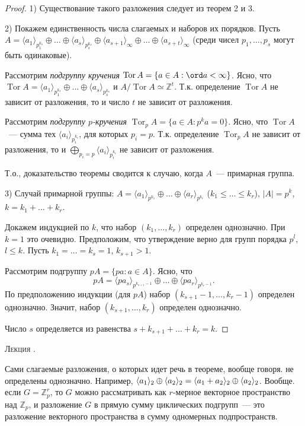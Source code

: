 \documentclass[a4paper]{article}
\newcounter{lec}
\renewcommand{\thelec}{\Roman{lec}}
\newcommand*{\lecture}[1]{\refstepcounter{lec}\vspace{20pt}
\begin{center}{\rmfamily\textsc{Лекция \thelec. \\ \textbf{#1}}}\vspace{5pt}
\end{center}}
\renewcommand{\Tor}{\mathop{\mathrm{Tor}}\nolimits}
\newcommand*{\p}[1]{#1\nobreak\discretionary{}{\hbox{$\mathsurround=0pt #1$}}{}}
\begin{document}
\begin{proof}
1) Существование такого разложения следует из теорем 2 и 3.

2) Покажем единственность числа слагаемых и наборов их порядков.
Пусть $A=\langle a_1\rangle_{p_1^{k_1}}\oplus\ldots\oplus\langle
a_s\rangle_{p_s^{k_s}}\oplus\langle
a_{s+1}\rangle_\infty\oplus\ldots\oplus\langle
a_{s+t}\rangle_\infty$ (среди чисел $p_1,\ldots,p_s$ могут быть
одинаковые).

Рассмотрим \emph{подгруппу кручения} $\Tor A=\{a\in A:\ord
a<\infty\}$. Ясно, что $\Tor A=\langle
a_1\rangle_{p_1^{k_1}}\oplus\ldots\oplus\langle
a_s\rangle_{p_s^{k_s}}$ и $A/\Tor A\simeq\mathbb{Z}^t$. Т.к.
определение $\Tor A$ не зависит от разложения, то и число $t$ не
зависит от разложения.

Рассмотрим \emph{подгруппу $p$-кручения} $\Tor_p A=\{a\in
A:p^ka=0\}$. Ясно, что $\Tor A$~--- сумма тех $\langle
a_i\rangle_{p_i^{k_i}}$, для которых $p_i=p$. Т.к. определение
$\Tor_pA$ не зависит от разложения, то и
$\bigoplus\limits_{p_i=p}\langle a_i\rangle_{p_i^{k_i}}$ не зависит
от разложения.

Т.о., доказательство теоремы сводится к случаю, когда $A$~---
примарная группа.

3) Случай примарной группы: $A=\langle
a_1\rangle_{p^{k_1}}\oplus\ldots\oplus\langle a_r\rangle_{p^{k_r}}$
($k_1\leqslant\ldots\leqslant k_r$), $|A|=p^k$, $k=k_1+\ldots+k_r$.

Докажем индукцией по $k$, что набор $(k_1,\ldots,k_r)$ определен
однозначно. При $k=1$ это очевидно. Предположим, что утверждение
верно для групп порядка $p^l$, $l\leqslant k$. Пусть
$k_1=\ldots=k_s=1$, $k_{s+1}>1$.

Рассмотрим подгруппу $pA=\{pa: a\in A\}$. Ясно, что
$$pA=\langle
pa_s\rangle_{p^{k_{s+1}-1}}\oplus\ldots\oplus\langle
pa_r\rangle_{p^{k_r-1}}.$$ По предположению индукции (для $pA$)
набор $(k_{s+1}-1,\ldots,k_r-1)$ определен однозначно. Значит, набор
$(k_{s+1},\ldots,k_r)$ определен однозначно.

Число $s$ определяется из равенства $s+k_{s+1}+\ldots+k_r=k$.
\end{proof}
\lecture{}

\begin{note}
Сами слагаемые разложения, о которых идет речь в теореме, вообще
говоря. не определены однозначно. Например, $\langle
a_1\rangle_2\oplus\langle a_2\rangle_2\p=\langle
a_1+a_2\rangle_2\oplus\langle a_2\rangle_2$. Вообще. если
$G=\mathbb{Z}_p^r$, то $G$ можно рассматривать как $r$-мерное
векторное пространство над $\mathbb{Z}_p$, и разложение $G$ в прямую
сумму циклических подгрупп~--- это разложение векторного
пространства в сумму одномерных подпространств.
\end{note}
\end{document}
